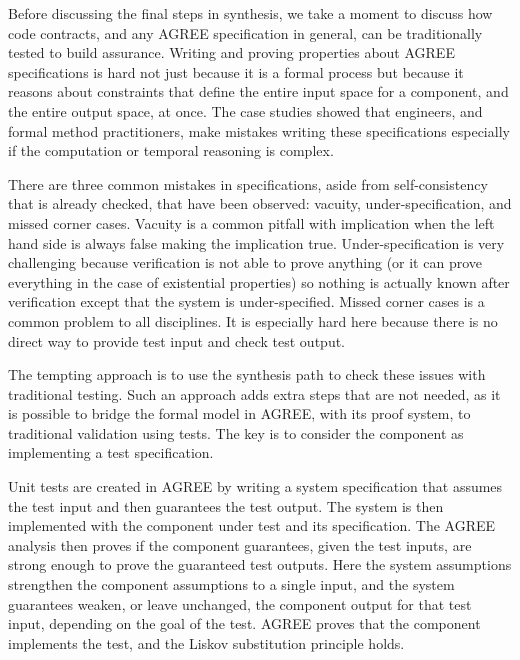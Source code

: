 Before discussing the final steps in synthesis, we take a moment to
discuss how code contracts, and any AGREE specification in general, can be traditionally tested to build assurance.
Writing and proving properties about AGREE specifications is hard not just because it is a formal process but  because it reasons about constraints that define the entire input space for a component, and the entire output space, at once.
The case studies showed that engineers, and formal method practitioners, make mistakes writing these specifications especially if the computation or temporal reasoning is complex.

There are three common mistakes in specifications, aside from self-consistency that is already checked, that have been observed: vacuity, under-specification, and missed corner cases.
Vacuity is a common pitfall with implication when the left hand side is always false making the implication true. 
Under-specification is very challenging because verification is not able to prove anything (or it can prove everything in the case of existential properties) so nothing is actually known after verification except that the system is under-specified. 
Missed corner cases is a common problem to all disciplines.
It is especially hard here because there is no direct way to provide test input and check test output.

The tempting approach is to use the synthesis path to check these issues with traditional testing.
Such an approach adds extra steps that are not needed, as it is
possible to bridge the formal model in AGREE, with its proof system, to
traditional validation using tests.
The key is to consider the component as implementing a test specification.

Unit tests are created in AGREE by writing a system specification that assumes the test input and then guarantees the test output.
The system is then implemented with the component under test and its specification.
The AGREE analysis then proves if the component guarantees, given the test inputs, are strong enough to prove the guaranteed test outputs.
Here the system assumptions strengthen the component assumptions to a single input, and the system guarantees weaken, or leave unchanged, the component output for that test input, depending on the goal of the test.
AGREE proves that the component implements the test, and the Liskov substitution principle holds.


